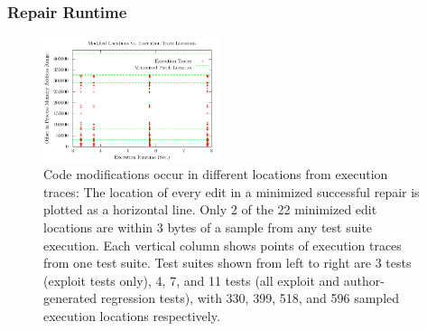 \documentclass{sigcomm-alternate}
\begin{document}
\subsubsection{Repair Runtime}
\label{runtime}



\begin{figure}[htb]
  \centering
  \includegraphics[width=0.46\textwidth]{ts-cov-and-runtime-w-min.pdf}  
  \caption{Code modifications occur in different locations from
    execution traces: The location of every edit in a minimized
    successful repair is plotted as a horizontal line.  Only 2 of the
    22 minimized edit locations are within 3 bytes of a sample from
    any test suite execution.  Each vertical column shows points of
    execution traces from one test suite.  Test suites shown from left
    to right are 3 tests (exploit tests only), 4, 7, and 11 tests (all
    exploit and author-generated regression tests), with 330, 399,
    518, and 596 sampled execution locations respectively.}
  \label{ts-cov-rt-w-min}
\end{figure}
\end{document}
